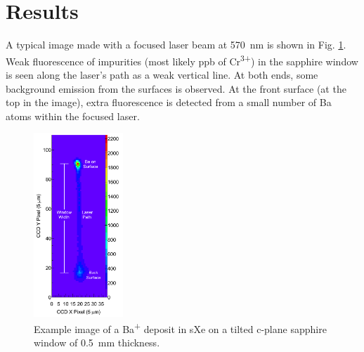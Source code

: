 \documentclass[aps,pra,reprint,superscriptaddress]{revtex4-1}
\begin{document}
\section{Results}
\label{sec:results}



A typical image made with a focused laser beam at 570~nm is shown in Fig. \ref{fig:image_example}.  Weak fluorescence of impurities (most likely ppb of Cr\textsuperscript{3+}) in the sapphire window is seen along the laser's path as a weak vertical line.  At both ends, some background emission from the surfaces is observed.  At the front surface (at the top in the image), extra fluorescence is detected from a small number of Ba atoms within the focused laser.

\begin{figure}
\includegraphics[width=0.3\textwidth]{figures/imageExamp_fromthesis.png}
\caption{Example image of a Ba\textsuperscript{+} deposit in sXe on a tilted c-plane sapphire window of 0.5~mm thickness.} %
\label{fig:image_example}
\end{figure}
\end{document}
